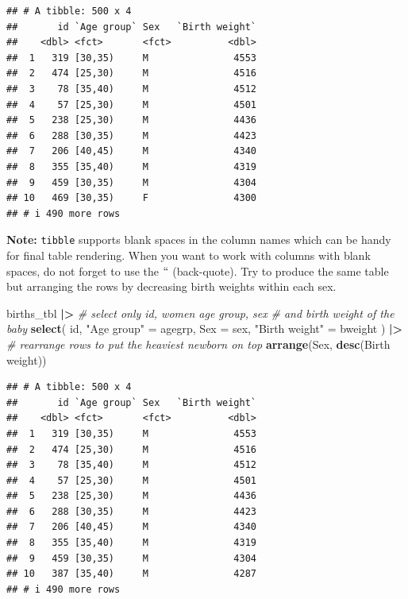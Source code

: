 \documentclass[
]{book}
\newenvironment{Shaded}{\begin{snugshade}}{\end{snugshade}}
\newcommand{\AttributeTok}[1]{\textcolor[rgb]{0.13,0.29,0.53}{#1}}
\newcommand{\CommentTok}[1]{\textcolor[rgb]{0.56,0.35,0.01}{\textit{#1}}}
\newcommand{\FunctionTok}[1]{\textcolor[rgb]{0.13,0.29,0.53}{\textbf{#1}}}
\newcommand{\NormalTok}[1]{#1}
\newcommand{\OtherTok}[1]{\textcolor[rgb]{0.56,0.35,0.01}{#1}}
\newcommand{\SpecialCharTok}[1]{\textcolor[rgb]{0.81,0.36,0.00}{\textbf{#1}}}
\newcommand{\StringTok}[1]{\textcolor[rgb]{0.31,0.60,0.02}{#1}}
\begin{document}
\begin{verbatim}
## # A tibble: 500 x 4
##       id `Age group` Sex   `Birth weight`
##    <dbl> <fct>       <fct>          <dbl>
##  1   319 [30,35)     M               4553
##  2   474 [25,30)     M               4516
##  3    78 [35,40)     M               4512
##  4    57 [25,30)     M               4501
##  5   238 [25,30)     M               4436
##  6   288 [30,35)     M               4423
##  7   206 [40,45)     M               4340
##  8   355 [35,40)     M               4319
##  9   459 [30,35)     M               4304
## 10   469 [30,35)     F               4300
## # i 490 more rows
\end{verbatim}

\textbf{Note:} \texttt{tibble} supports blank spaces in the column names which can be handy for final table
rendering. When you want to work with columns with blank spaces, do not forget to use the \(``\)
(back-quote).
Try to produce the same table but arranging the rows by decreasing birth weights within each sex.

\begin{Shaded}
\begin{Highlighting}[]
\NormalTok{births\_tbl }\SpecialCharTok{|\textgreater{}}
  \CommentTok{\# select only id, women age group, sex }
  \CommentTok{\# and birth weight of the baby}
  \FunctionTok{select}\NormalTok{(}
\NormalTok{    id,}
    \StringTok{"Age group"} \OtherTok{=}\NormalTok{ agegrp,}
    \AttributeTok{Sex =}\NormalTok{ sex,}
    \StringTok{"Birth weight"} \OtherTok{=}\NormalTok{ bweight}
\NormalTok{  ) }\SpecialCharTok{|\textgreater{}}
  \CommentTok{\# rearrange rows to put the heaviest newborn on top}
  \FunctionTok{arrange}\NormalTok{(Sex, }\FunctionTok{desc}\NormalTok{(}\StringTok{\textasciigrave{}}\AttributeTok{Birth weight}\StringTok{\textasciigrave{}}\NormalTok{))}
\end{Highlighting}
\end{Shaded}

\begin{verbatim}
## # A tibble: 500 x 4
##       id `Age group` Sex   `Birth weight`
##    <dbl> <fct>       <fct>          <dbl>
##  1   319 [30,35)     M               4553
##  2   474 [25,30)     M               4516
##  3    78 [35,40)     M               4512
##  4    57 [25,30)     M               4501
##  5   238 [25,30)     M               4436
##  6   288 [30,35)     M               4423
##  7   206 [40,45)     M               4340
##  8   355 [35,40)     M               4319
##  9   459 [30,35)     M               4304
## 10   387 [35,40)     M               4287
## # i 490 more rows
\end{verbatim}
\end{document}
